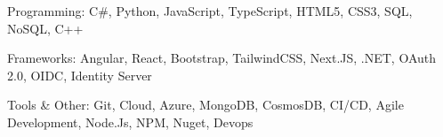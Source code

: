 \vspace{-1\baselineskip}
\begin{cvskills}
  \cvskill
    {Programming:} %
    {C\#, Python, JavaScript, TypeScript, HTML5, CSS3, SQL, NoSQL, C++} %

  \cvskill
    {Frameworks:} %
    {Angular, React, Bootstrap, TailwindCSS, Next.JS, .NET, OAuth 2.0, OIDC, Identity Server} %

  \cvskill
    {Tools \& Other:} %
    {Git, Cloud, Azure, MongoDB, CosmosDB, CI/CD, Agile Development, Node.Js, NPM, Nuget, Devops} %

\end{cvskills}
\vspace{-0.5\baselineskip}